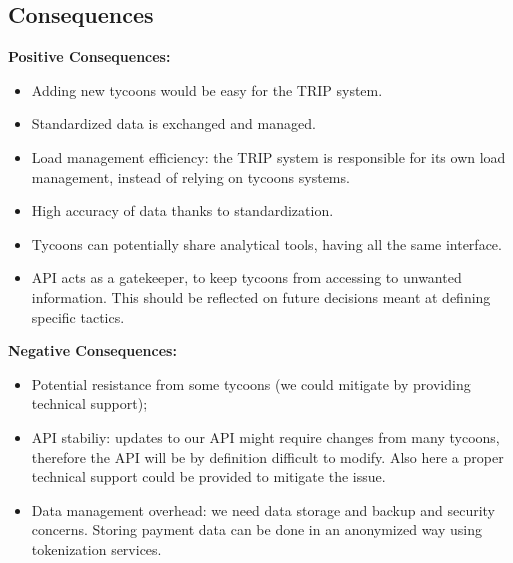 \subsection*{Consequences}
\textbf{Positive Consequences:}
\begin{itemize}
    \item Adding new tycoons would be easy for the TRIP system.
    \item Standardized data is exchanged and managed.
    \item Load management efficiency: the TRIP system is responsible for its own load management, instead of relying on tycoons systems.
    \item High accuracy of data thanks to standardization.
    \item Tycoons can potentially share analytical tools, having all the same interface.
    \item API acts as a gatekeeper, to keep tycoons from accessing to unwanted information. This should be reflected on future decisions meant at defining specific tactics.
\end{itemize}
\textbf{Negative Consequences:}
\begin{itemize}
    \item Potential resistance from some tycoons (we could mitigate by providing technical support);
    \item API stabiliy: updates to our API might require changes from many tycoons, therefore the API will be by definition difficult to modify. Also here a proper technical support could be provided to mitigate the issue.
    \item Data management overhead: we need data storage and backup and security concerns. Storing payment data can be done in an anonymized way using tokenization services.
\end{itemize}